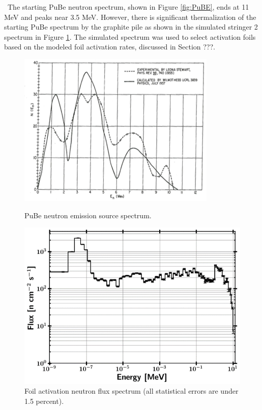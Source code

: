 \documentclass[journal]{IEEEtran}
\let\MYoriglatexcaption\caption
\renewcommand{\caption}[2][\relax]{\MYoriglatexcaption[#2]{#2}}
\begin{document}
	\ The starting PuBe neutron spectrum, shown in Figure \ref{fig:PuBE}, ends at 11 MeV and peaks near 3.5 MeV. 
However, there is significant thermalization of the starting PuBe spectrum by the graphite pile as shown in the simulated stringer 2 spectrum in Figure \ref{fig:Spec1}. 
The simulated spectrum was used to select activation foils based on the modeled foil activation rates, discussed in Section ???. 
	
	\begin{figure}[h!]
	\includegraphics[width=\linewidth]{Figures/PuBe.png}
	\caption{PuBe neutron emission source spectrum.}
	\label{fig:PuBE}

	\vskip 0.25cm

	\includegraphics[width=\linewidth]{Figures/PileSpec.png}
	\caption{Foil activation neutron flux spectrum (all statistical errors are under 1.5 percent).}
	\label{fig:Spec1}
	\end{figure}
\end{document}
